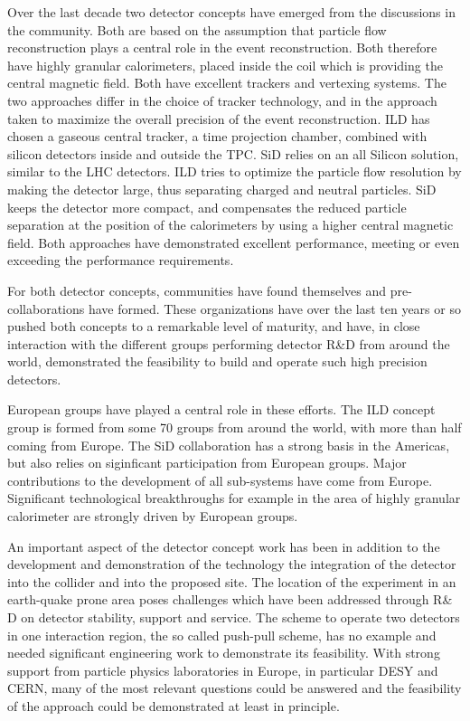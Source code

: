 \documentclass[%
 reprint,
 amsmath,amssymb,
 aps,
]{revtex4-1}
\begin{document}
Over the last decade two detector concepts have emerged from the discussions in the community. Both are based on the assumption that particle flow reconstruction plays a central role in the event reconstruction. Both therefore have highly granular calorimeters, placed inside the coil which is providing the central magnetic field. Both have excellent trackers and vertexing systems. The two approaches differ in the choice of tracker technology, and in the approach taken to maximize the overall precision of the event reconstruction. ILD has chosen a gaseous central tracker, a time projection chamber, combined with silicon detectors inside and outside the TPC. SiD relies on an all Silicon solution, similar to the LHC detectors. ILD tries to optimize the particle flow resolution by making the detector large, thus separating charged and neutral particles. SiD keeps the detector more compact, and compensates the reduced particle separation at the position of the calorimeters by using a higher central magnetic field. Both approaches have demonstrated excellent performance, meeting or even exceeding the performance requirements. 

For both detector concepts, communities have found themselves and pre-collaborations have formed. These organizations have over the last ten years or so pushed both concepts to a remarkable level of maturity, and have, in close interaction with the different groups performing detector R\&D from around the world, demonstrated the feasibility to build and operate such high precision detectors. 

European groups have played a central role in these efforts. The ILD concept group is formed from some 70 groups from around the world, with more than half coming from Europe. The SiD collaboration has a strong basis in the Americas, but also relies on siginficant participation from European groups. Major contributions to the development of all sub-systems have come from Europe. Significant technological breakthroughs for example in the area of highly granular calorimeter are strongly driven by European groups. 

An important aspect of the detector concept work has been in addition to the development and demonstration of the technology the integration of the detector into the collider and into the proposed site. The location of the experiment in an earth-quake prone area poses challenges which have been addressed through R\& D on detector stability, support and service. The scheme to operate two detectors in one interaction region, the so called push-pull scheme, has no example and needed significant engineering work to demonstrate its feasibility. With strong support from particle physics laboratories in Europe, in  particular DESY and CERN, many of the most relevant questions could be answered and the feasibility of the approach could be demonstrated at least in principle. 
\end{document}
